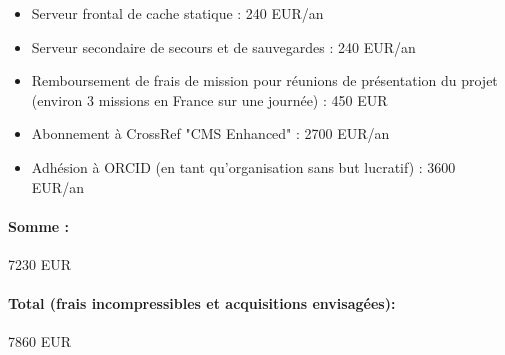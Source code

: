 \documentclass[a4paper]{article}
\begin{document}
\begin{itemize}
    \item Serveur frontal de cache statique : 240 EUR/an
    \item Serveur secondaire de secours et de sauvegardes : 240 EUR/an
    \item Remboursement de frais de mission pour réunions de présentation du projet (environ 3 missions en France sur une journée) : 450 EUR
    \item Abonnement à CrossRef "CMS Enhanced" : 2700 EUR/an
    \item Adhésion à ORCID (en tant qu'organisation sans but lucratif) : 3600 EUR/an
\end{itemize}

\paragraph{Somme :} 7230 EUR

\paragraph{Total (frais incompressibles et acquisitions envisagées):} 7860 EUR
\end{document}
